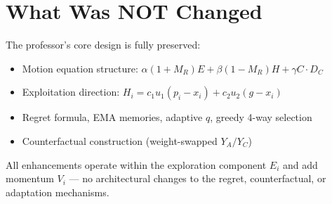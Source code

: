 \documentclass[10pt,twocolumn]{article}
\begin{document}
\section{What Was NOT Changed}

The professor's core design is fully preserved:
\begin{itemize}[nosep]
\item Motion equation structure: $\alpha(1+M_R)E + \beta(1-M_R)H + \gamma C \cdot D_C$
\item Exploitation direction: $H_i = c_1 u_1 (p_i - x_i) + c_2 u_2 (g - x_i)$
\item Regret formula, EMA memories, adaptive $q$, greedy 4-way selection
\item Counterfactual construction (weight-swapped $Y_A/Y_C$)
\end{itemize}

All enhancements operate within the exploration component $E_i$ and add momentum $V_i$ --- no architectural changes to the regret, counterfactual, or adaptation mechanisms.
\end{document}
